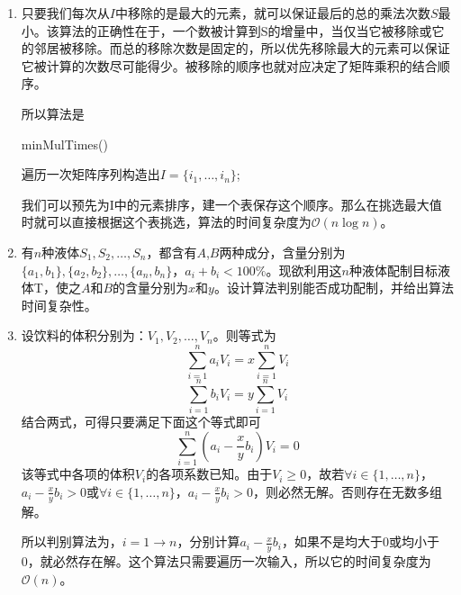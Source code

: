 \documentclass[12pt,a4paper]{article}
\makeatletter
\newtheorem*{solution}{Solution}
\theoremstyle{definition}
\renewenvironment{solution}[1][Solution] {\par\pushQED{\qed}\normalfont\topsep6\p@\@plus6\p@\relax\trivlist\item[\hskip\labelsep\bfseries#1\@addpunct{.}]\ignorespaces}{\popQED\endtrivlist\@endpefalse} \makeatother
\makeatother
\begin{document}
\begin{enumerate}
\begin{solution}
	只要我们每次从$I$中移除的是最大的元素，就可以保证最后的总的乘法次数$S$最小。该算法的正确性在于，一个数被计算到S的增量中，当仅当它被移除或它的邻居被移除。而总的移除次数是固定的，所以优先移除最大的元素可以保证它被计算的次数尽可能得少。被移除的顺序也就对应决定了矩阵乘积的结合顺序。
	
	所以算法是
	\begin{algorithm}
		\caption{minMulTimes()}
		遍历一次矩阵序列构造出$I=\{i_1,\ldots,i_n\}$;
	\end{algorithm}

	我们可以预先为I中的元素排序，建一个表保存这个顺序。那么在挑选最大值时就可以直接根据这个表挑选，算法的时间复杂度为$\mathcal{O}(n\log n)$。
\end{solution} 

\item 有$n$种液体$S_1,S_2,\ldots,S_n$，都含有$A$,$B$两种成分，含量分别为$\{a_1,b_1\},\{a_2,b_2\},\ldots,\{a_n,b_n\}$，$a_i+b_i<100\%$。现欲利用这$n$种液体配制目标液体T，使之$A$和$B$的含量分别为$x$和$y$。设计算法判别能否成功配制，并给出算法时间复杂性。

\begin{solution}
	设饮料的体积分别为：$V_1,V_2,\ldots,V_n$。则等式为
	$$\sum_{i=1}^{n}{a_iV_i}=x\sum_{i=1}^{n}{V_i}$$
	$$\sum_{i=1}^{n}{b_iV_i}=y\sum_{i=1}^{n}{V_i}$$
	结合两式，可得只要满足下面这个等式即可
	$$\sum_{i=1}^{n}{(a_i-\frac{x}{y}b_i)V_i}=0$$
	该等式中各项的体积$V_i$的各项系数已知。由于$V_i\geq0$，故若$\forall i\in\{1,\ldots,n\}$，$a_i-\frac{x}{y}b_i>0$或$\forall i\in\{1,\ldots,n\}$，$a_i-\frac{x}{y}b_i>0$，则必然无解。否则存在无数多组解。
	
	所以判别算法为，$i=1\to n$，分别计算$a_i-\frac{x}{y}b_i$，如果不是均大于0或均小于0，就必然存在解。这个算法只需要遍历一次输入，所以它的时间复杂度为$\mathcal{O}(n)$。
\end{solution}
\end{enumerate}

\end{document}
